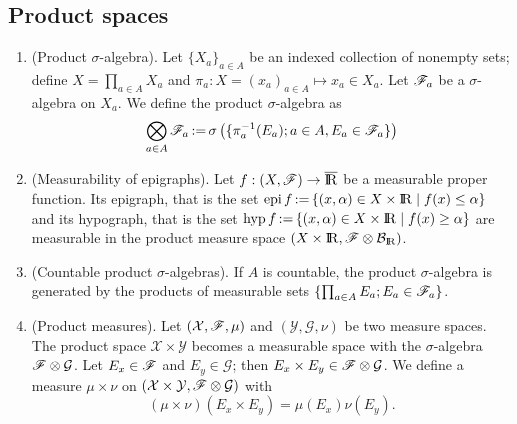 \documentclass[a4paper,10pt]{article}
\begin{document}
\subsection{Product spaces}
\begin{enumerate}
 \item (Product $\sigma$-algebra). Let $\{X_a\}_{a\in A}$ be an indexed collection of nonempty sets; define 
       $X=\prod_{a\in A}X_a$ and $\pi_a: X = (x_a)_{a\in A} \mapsto x_a\in X_a$. Let $\mathscr{F}_a$ be a $\sigma$-algebra
       on $X_a$. We define the product $\sigma$-algebra as
       \[
        \bigotimes_{a\in A} \mathscr{F}_a {}\mathop{\mathrel{:}=}{} \sigma\left( \{\pi_a^{-1}(E_a);a\in A, E_a\in \mathscr{F}_a\}\right)
       \]
       
 \item (Measurability of epigraphs). Let $f:(X,\F)\to\barre$ be a measurable proper function. Its epigraph, that is
       the set $\epi f \dfn \{(x,\alpha)\in X\times \Re {}\mid{} f(x) \leq \alpha\}$ and its hypograph, that is
       the set $\hyp f \dfn \{(x,\alpha) \in X\times \Re {}\mid{} f(x) \geq \alpha\}$ are measurable in the product
       measure space $(X\times \Re, \F\otimes \B_\Re)$.
       
 \item (Countable product $\sigma$-algebras). If $A$ is countable, the product $\sigma$-algebra       
       is generated by the products of measurable sets $\{\prod_{a\in A}E_a; E_a\in \mathscr{F}_a\}$.
       
 \item (Product measures). Let $(\mathcal{X},\mathscr{F},\mu)$ and $(\mathcal{Y},\mathcal{G},\nu)$ be two measure spaces.
       The product space $\mathcal{X}\times \mathcal{Y}$ becomes a measurable space with the $\sigma$-algebra 
       $\mathscr{F}\otimes \mathcal{G}$. Let $E_x\in\mathscr{F}$ and $E_y\in\mathcal{G}$; then $E_x\times E_y\in\mathscr{F}\otimes \mathcal{G}$.
       We define a measure $\mu\times\nu$ on $(\mathcal{X}\times \mathcal{Y}, \mathscr{F}\otimes\mathcal{G})$ with 
       \[
        (\mu\times \nu)(E_x\times E_y) = \mu(E_x) \nu(E_y).
       \]
       

\end{enumerate}
\end{document}
